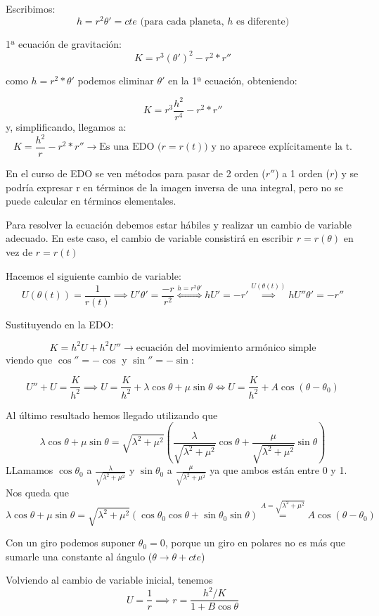 Escribimos:
\[h= r^2\theta'=cte \text{ (para cada planeta, } h \text{ es diferente)}\]

1ª ecuación de gravitación:
\[K= r^3(\theta')^2 -r^2*r''\]

como $h = r^2*\theta'$ podemos eliminar $\theta'$ en la 1ª ecuación, obteniendo:

$$K= r^3 \frac{h^2}{r^4} - r^2*r''$$
y, simplificando, llegamos a:
$$K= \frac{h^2}{r} - r^2*r''  \rightarrow  \text{Es una EDO ($r = r(t)$) y no aparece explícitamente la t.}$$

\obs En el curso de EDO se ven métodos para pasar de 2 orden ($r''$) a 1 orden ($r$) y se podría expresar r en términos de la imagen inversa de una integral, pero no se puede calcular en términos elementales.

Para resolver la ecuación debemos estar hábiles y realizar un cambio de variable adecuado. En este caso, el cambio de variable consistirá en escribir $r=r(\theta)$ en vez de $r=r(t)$

Hacemos el siguiente cambio de variable:
$$U(\theta(t)) = \frac{1}{r(t)} \implies U'\theta' = \frac{-r}{r^2} \stackrel{h=r^2\theta' }{\iff} hU' = -r' \stackrel{U(\theta(t))}{\implies} hU''\theta' = -r''$$

Sustituyendo en la EDO:

$$K= h^2U + h^2U'' \rightarrow \text{ecuación del movimiento armónico simple}$$
viendo que $\cos'' = -\cos$ y $\sin'' = -\sin$:

$$U'' + U = \frac{K}{h^2} \implies U= \frac{K}{h^2} + \lambda\cos\theta + \mu\sin\theta \iff U= \frac{K}{h^2} + A\cos(\theta - \theta_0)$$
\begin{mdframed}
\obs Al último resultado hemos llegado utilizando que
$$ \lambda\cos\theta + \mu\sin\theta = \sqrt{\lambda^2 + \mu^2}\left(\frac{\lambda}{\sqrt{\lambda^2 + \mu^2}}\cos\theta  +\frac{\mu}{ \sqrt{\lambda^2 + \mu^2}}\sin\theta\right)$$
LLamamos $\cos\theta_0$ a $\frac{\lambda}{ \sqrt{\lambda^2 + \mu^2}}$ y $\sin\theta_0$ a $\frac{\mu}{ \sqrt{\lambda^2 + \mu^2}}$ ya que ambos están entre 0 y 1.
Nos queda que
$$\lambda\cos\theta + \mu\sin\theta = \sqrt{\lambda^2 + \mu^2}(\cos\theta_0\cos\theta + \sin\theta_0\sin\theta) \stackrel{A=\sqrt{\lambda^2 + \mu^2}}{=} A\cos(\theta - \theta_0)$$
\end{mdframed}
Con un giro podemos suponer $\theta_0 = 0$, porque un giro en polares no es más que sumarle una constante al ángulo ($\theta \rightarrow \theta + cte$)

Volviendo al cambio de variable inicial, tenemos
\[U = \frac{1}{r} \implies r=\frac{h^2/K}{1 + B\cos\theta}\]

